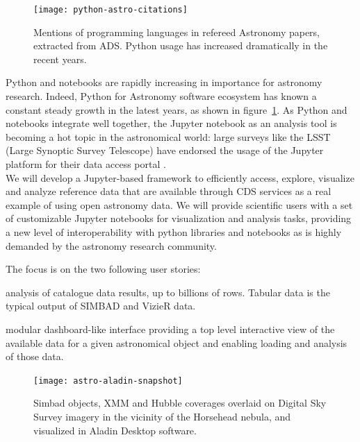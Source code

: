 \begin{figure}[ht!]\centering
  \texttt{[image: python-astro-citations]}
  \caption{Mentions of programming languages in refereed Astronomy papers, extracted from ADS. Python usage has increased dramatically in the recent years.}\label{fig:python-astro-citations}
\end{figure}

  Python and notebooks are rapidly increasing in importance for astronomy
  research. Indeed, Python for Astronomy software ecosystem has known a
  constant steady growth in the latest years, as shown in
  figure~\ref{fig:python-astro-citations}. As Python and notebooks integrate
  well together, the Jupyter notebook as an analysis tool is becoming a hot
  topic in the astronomical world: large surveys like the LSST (Large Synoptic
  Survey Telescope) have endorsed the usage of the Jupyter platform for their
    data access portal \cite{lsst2017scienceplatform}.\\


  We will develop a Jupyter-based framework to efficiently access, explore,
  visualize and analyze reference data that are available through CDS services
  as a real example of using open astronomy data.
  We will provide scientific users with a set of customizable Jupyter notebooks
  for visualization and analysis tasks, providing a new level of
  interoperability with python libraries and notebooks as is highly demanded
  by the astronomy research community.

  The focus is on the two following user stories:
    \begin{compactitem}
        \item analysis of catalogue data results, up to billions of rows.
              Tabular data is the typical output of SIMBAD and VizieR data.
        \item modular dashboard-like interface providing a top level
              interactive view of the available data for a given astronomical
              object and enabling loading and analysis of those data.
    \end{compactitem}


\begin{figure}[ht!]\centering
  \texttt{[image: astro-aladin-snapshot]}
  \caption{Simbad objects, XMM and Hubble coverages overlaid on Digital Sky Survey imagery in the vicinity of the Horsehead nebula, and visualized in Aladin Desktop software.}\label{fig:astro-aladin-snapshot}
\end{figure}

